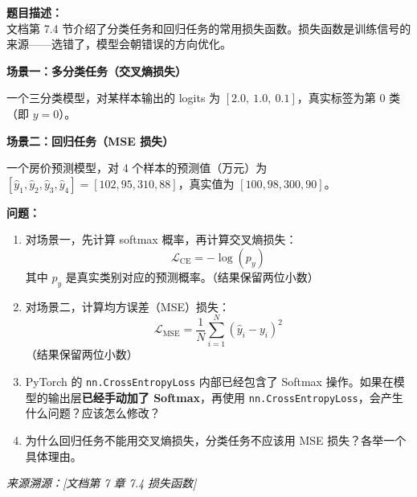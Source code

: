 \documentclass[a4paper,11pt]{ctexart}
\begin{document}
\begin{problembox}
    \textbf{题目描述：}\\
    文档第 7.4 节介绍了分类任务和回归任务的常用损失函数。损失函数是训练信号的来源——选错了，模型会朝错误的方向优化。

    \vspace{0.3cm}
    \textbf{场景一：多分类任务（交叉熵损失）}

    一个三分类模型，对某样本输出的 logits 为 $[2.0,\ 1.0,\ 0.1]$，真实标签为第 0 类（即 $y=0$）。

    \vspace{0.2cm}
    \textbf{场景二：回归任务（MSE 损失）}

    一个房价预测模型，对 4 个样本的预测值（万元）为 $[\hat{y}_1, \hat{y}_2, \hat{y}_3, \hat{y}_4] = [102, 95, 310, 88]$，真实值为 $[100, 98, 300, 90]$。

    \vspace{0.3cm}
    \textbf{问题：}
    \begin{enumerate}[(1)]
        \item 对场景一，先计算 softmax 概率，再计算交叉熵损失：
        \[
        \mathcal{L}_{\text{CE}} = -\log(p_{y})
        \]
        其中 $p_y$ 是真实类别对应的预测概率。（结果保留两位小数）

        \item 对场景二，计算均方误差（MSE）损失：
        \[
        \mathcal{L}_{\text{MSE}} = \frac{1}{N}\sum_{i=1}^{N}(\hat{y}_i - y_i)^2
        \]
        （结果保留两位小数）

        \item PyTorch 的 \texttt{nn.CrossEntropyLoss} 内部已经包含了 Softmax 操作。如果在模型的输出层\textbf{已经手动加了 Softmax}，再使用 \texttt{nn.CrossEntropyLoss}，会产生什么问题？应该怎么修改？

        \item 为什么回归任务不能用交叉熵损失，分类任务不应该用 MSE 损失？各举一个具体理由。
    \end{enumerate}

    \vspace{0.2cm}
    {\color{gray}\small\textit{来源溯源：[文档第 7 章 7.4 损失函数]}}
\end{problembox}
\end{document}

